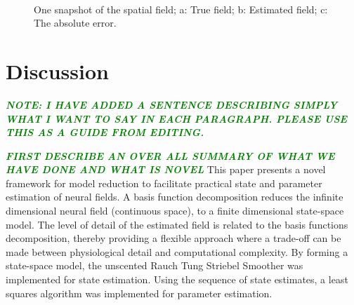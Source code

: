 \documentclass[12pt]{iopart}
\newcommand{\omg}[1]{\textsf{\emph{\textbf{\textcolor{green}{#1}}}}}
\begin{document}
\begin{figure}[!th]
\centering 
{}
\\
\caption{One snapshot of the spatial field; a: True field; b: Estimated field; c: The absolute error.}
\label{fig:FieldEstimate}
\end{figure}

\section{Discussion}\label{DiscussionSection}

\omg{NOTE: I HAVE ADDED A SENTENCE DESCRIBING SIMPLY WHAT I WANT TO SAY IN EACH PARAGRAPH. PLEASE USE THIS AS A GUIDE FROM EDITING.}

\omg{FIRST DESCRIBE AN OVER ALL SUMMARY OF WHAT WE HAVE DONE AND WHAT IS NOVEL}
This paper presents a novel framework for model reduction to facilitate practical state and parameter estimation of neural fields. A basis function decomposition reduces the infinite dimensional neural field (continuous space), to a finite dimensional state-space model. The level of detail of the estimated field is related to the basis functions decomposition, thereby providing a flexible approach where a trade-off can be made between physiological detail and computational complexity. By forming a state-space model, the unscented Rauch Tung Striebel Smoother was implemented for state estimation. Using the sequence of state estimates, a least squares algorithm was implemented for parameter estimation.  
\end{document}
